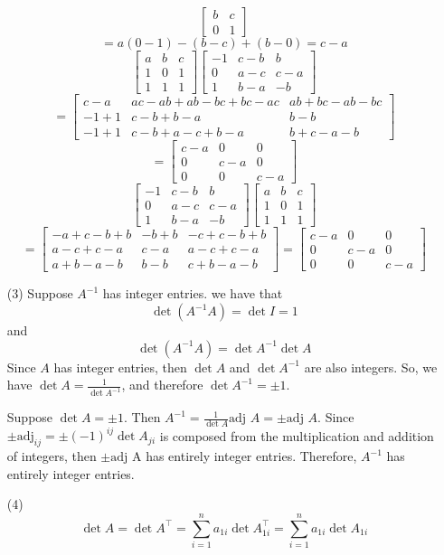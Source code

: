 \begin{itemize}
$$\begin{bmatrix}
b & c \\
0 & 1
\end{bmatrix}$$
$$= a(0 - 1) - (b - c) + (b - 0) = c - a$$
$$\begin{bmatrix}
a & b & c \\
1 & 0 & 1 \\
1 & 1 & 1
\end{bmatrix}\begin{bmatrix}
-1 & c - b & b \\
0 & a - c & c - a \\
1 & b - a & -b
\end{bmatrix}$$
$$= \begin{bmatrix}
c - a & ac - ab + ab - bc + bc - ac & ab + bc  - ab - bc \\
-1 + 1 & c - b + b - a & b - b \\
-1 + 1 & c - b + a - c + b - a & b + c - a - b
\end{bmatrix} $$
$$= \begin{bmatrix}
c - a & 0 & 0 \\
0 & c - a & 0 \\
0 & 0 & c - a
\end{bmatrix}$$
$$\begin{bmatrix}
-1 & c - b & b \\
0 & a - c & c - a \\
1 & b - a & -b
\end{bmatrix}\begin{bmatrix}
a & b & c \\
1 & 0 & 1 \\
1 & 1 & 1
\end{bmatrix}$$
$$= \begin{bmatrix}
-a + c - b + b & -b + b & -c + c - b + b \\
a - c + c - a & c - a & a - c + c - a \\
a + b - a - b & b - b & c + b - a - b
\end{bmatrix} = \begin{bmatrix}
c - a & 0 & 0 \\
0 & c - a & 0 \\
0 & 0 & c - a
\end{bmatrix}$$
\item[(3)]
Suppose $A^{-1}$ has integer entries. we have that
$$\det(A^{-1}A) = \det I = 1$$
and
$$\det(A^{-1}A) = \det A^{-1}\det A$$
Since $A$ has integer entries, then $\det A$ and $\det A^{-1}$ are also integers. So, we have $\det A = \frac{1}{\det A^{-1}}$, and therefore $\det A^{-1} = \pm 1$.

Suppose $\det A = \pm 1$. Then $A^{-1} = \frac{1}{\det A}\text{adj }A = \pm \text{adj }A$. Since $\pm\text{adj}_{ij} = \pm(-1)^{ij}\det A_{ji}$ is composed from the multiplication and addition of integers, then $\pm \text{adj A}$ has entirely integer entries. Therefore, $A^{-1}$ has entirely integer entries.
\item[(4)]
$$\det A = \det A^\top = \sum_{i=1}^n a_{1i}\det A_{1i}^\top = \sum_{i=1}^n a_{1i}\det A_{1i}$$
\end{itemize}
